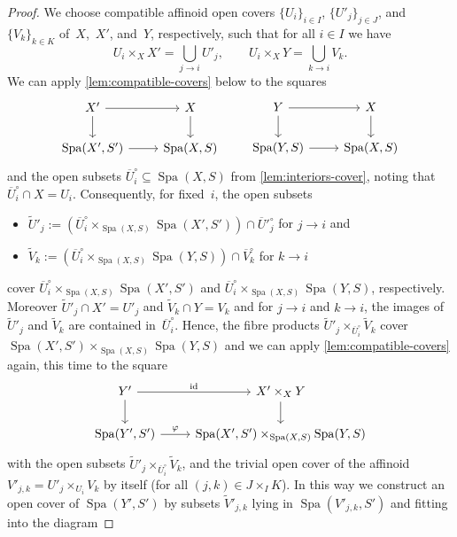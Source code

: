 \documentclass[a4paper,twoside,11pt,reqno]{amsart}
\DeclareMathOperator{\id}{id}
\DeclareMathOperator{\Spa}{Spa}
\newcommand{\ov}[1]{\overline{#1}}
\theoremstyle{definition}
\numberwithin{equation}{subsection}
\begin{document}
\begin{proof}
    We choose compatible affinoid open covers $\{U_i\}_{i \in I}$, $\{U'_j\}_{j \in J}$, and $\{V_k\}_{k \in K}$ of~$X$,~$X'$, and~$Y$, respectively, such that for all $i \in I$ we have
    \[
        U_i \times_X X' = \bigcup_{j \to i} U'_j, \qquad U_i \times_X Y = \bigcup_{k \to i} V_k.
    \]
    We can apply \cref{lem:compatible-covers} below to the squares
    \[
        \begin{tikzcd}
            X' \ar[r] \ar[d] & X \ar[d] \\
            \Spa(X',S')  \ar[r] & \Spa(X,S)
        \end{tikzcd} \qquad
             \begin{tikzcd}
            Y \ar[r] \ar[d] & X \ar[d] \\
            \Spa(Y,S)  \ar[r] & \Spa(X,S)
        \end{tikzcd}
    \]
    and the open subsets $\ov U_i^\circ \subseteq \Spa(X,S)$ from \cref{lem:interiors-cover}, noting that $\ov U_i^\circ \cap X = U_i$.
    Consequently, for fixed~$i$, the open subsets 
    \begin{itemize}
        \item 
        $\widetilde{U}'_j := (\ov U^\circ_i \times_{\Spa(X,S)} \Spa(X',S')) \cap \ov U'^\circ_j$ for $j \to i$ and
        \item 
        $\widetilde{V}_k := (\ov U^\circ_i \times_{\Spa(X,S)} \Spa(Y,S)) \cap \ov V_k^\circ$ for $k \to i$
    \end{itemize}  
    cover $\ov U^\circ_i \times_{\Spa(X,S)} \Spa(X',S')$ and $\ov U^\circ_i \times_{\Spa(X,S)} \Spa(Y,S)$, respectively.
    Moreover $\widetilde{U}'_j \cap X' = U'_j$ and $\widetilde{V}_k \cap Y = V_k$ and for $j \to i$ and $k \to i$, the images of~$\widetilde{U}'_j$ and $\widetilde{V}_k$ are contained in~$\ov U^\circ_i$.
    Hence, the fibre products $\widetilde{U}'_j \times_{\ov U^\circ_i} \widetilde{V}_k$ cover $\Spa(X',S') \times_{\Spa(X,S)} \Spa(Y,S)$ and we can apply \cref{lem:compatible-covers} again, this time to the square
    \[
        \begin{tikzcd}
            Y' \ar[r,"\id"] \ar[d] & X' \times_X Y \ar[d] \\
            \Spa(Y',S') \ar[r,"\varphi"] & \Spa(X',S') \times_{\Spa(X,S)} \Spa(Y,S)
        \end{tikzcd}
    \]
    with the open subsets $\widetilde{U}'_j \times_{\ov U^\circ_i} \widetilde{V}_k$, and the trivial open cover of the affinoid $V'_{j,k} = U'_j \times_{U_i} V_k$ by itself (for all $(j,k) \in J \times_I K$).
    In this way we construct an open cover of $\Spa(Y',S')$ by subsets $\widetilde{V}'_{j,k}$  lying in $\Spa(V'_{j,k},S')$ and fitting into the diagram

\end{proof}
\end{document}

